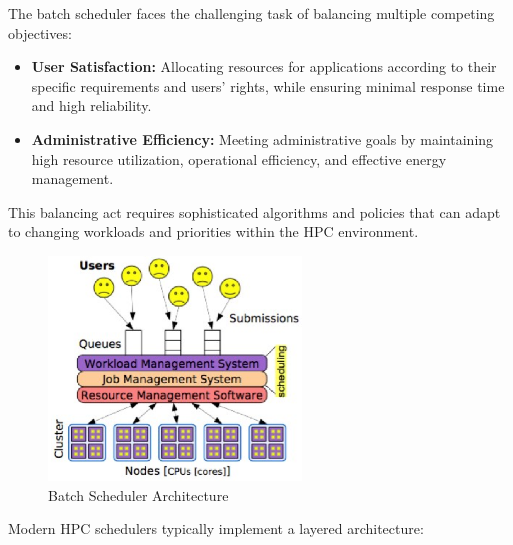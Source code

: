\vspace{0.5em}

The batch scheduler faces the challenging task of balancing multiple competing objectives:

\begin{itemize}
    \item \textbf{User Satisfaction:} Allocating resources for applications according to their specific requirements and users' rights, while ensuring minimal response time and high reliability.
    
    \item \textbf{Administrative Efficiency:} Meeting administrative goals by maintaining high resource utilization, operational efficiency, and effective energy management.
\end{itemize}

This balancing act requires sophisticated algorithms and policies that can adapt to changing workloads and priorities within the HPC environment.

\begin{figure}[H]
    \centering
    \includegraphics[width=0.6\textwidth]{assets/batch_scheduler.png}
    \caption{Batch Scheduler Architecture}
    \label{fig:batch_scheduler}
\end{figure}

Modern HPC schedulers typically implement a layered architecture:

